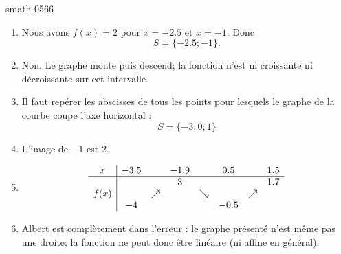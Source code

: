 
\begin{corrige}{smath-0566}

    \begin{enumerate}
        \item
            Nous avons \( f(x)=2\) pour \( x=-2.5\) et \( x=-1\). Donc 
            \begin{equation}
                S=\{ -2.5;-1 \}.
            \end{equation}
        \item
            Non. Le graphe monte puis descend; la fonction n'est ni croissante ni décroissante sur cet intervalle.
        \item
            Il faut repérer les abscisses de tous les points pour lesquels le graphe de la courbe coupe l'axe horizontal :
            \begin{equation}
                S=\{ -3;0;1 \}
            \end{equation}
        \item
            L'image de \( -1\) est \( 2\).
        \item
            \begin{equation*}
                \begin{array}[]{c|ccccccc}
                    x&-3.5&&-1.9&&0.5&&1.5\\
                    \hline
                    &&&3&&&&1.7\\
                    f(x)&&\nearrow&&\searrow&&\nearrow&\\
                    &-4&&&&-0.5&&\\
                \end{array}
            \end{equation*}
        \item
            Albert est complètement dans l'erreur : le graphe présenté n'est même pas une droite; la fonction ne peut donc être linéaire (ni affine en général).
    \end{enumerate}

\end{corrige}
